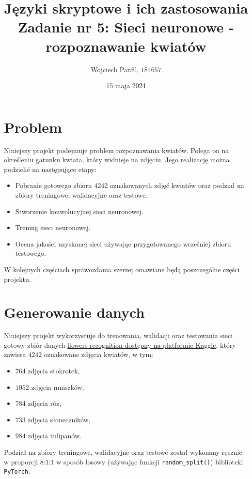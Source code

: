\documentclass[11pt]{article}
\title{
	\textbf{Języki skryptowe i ich zastosowania}\\
	Zadanie nr 5: Sieci neuronowe - rozpoznawanie kwiatów}
\author{Wojciech Panfil, $184657$}
\date{15 maja 2024}
\begin{document}
	\maketitle

	\section{Problem}
	Niniejszy projekt podejmuje problem rozpoznawania kwiatów. Polega on na określeniu
	gatunku kwiata, który widnieje na zdjęciu. Jego realizację można podzielić na następujące etapy:
	\begin{itemize}
		\item Pobranie gotowego zbioru $4242$ oznakowanych zdjęć kwiatów oraz podział na zbiory treningowe, walidacyjne oraz testowe.
		\item Stworzenie konwolucyjnej sieci neuronowej.
		\item Trening sieci neuronowej.
		\item Ocena jakości uzyskanej sieci używając przygotowanego wcześniej zbioru testowego.
	\end{itemize}

	W kolejnych częściach sprawozdania szerzej omawiane będą poszczególne części projektu.

	\section{Generowanie danych}
	Niniejszy projekt wykorzystuje do trenowania, walidacji oraz testowania sieci gotowy
	zbiór danych \href{https://www.kaggle.com/datasets/alxmamaev/flowers-recognition}{flowers-recognition dostępny na platformie Kaggle},
	który zawiera $4242$ oznakowane zdjęcia kwiatów, w tym:
	\begin{itemize}
		\item $764$ zdjęcia stokrotek,
		\item $1052$ zdjęcia mniszków,
		\item $784$ zdjęcia róż,
		\item $733$ zdjęcia słoneczników,
		\item $984$ zdjęcia tulipanów.
	\end{itemize}
	Podział na zbiory treningowe, walidacyjne oraz testowe został wykonany ręcznie w proporcji $8$:$1$:$1$ w sposób losowy
	(używając funkcji \texttt{random\_split()}) biblioteki \texttt{PyTorch}.
\end{document}
